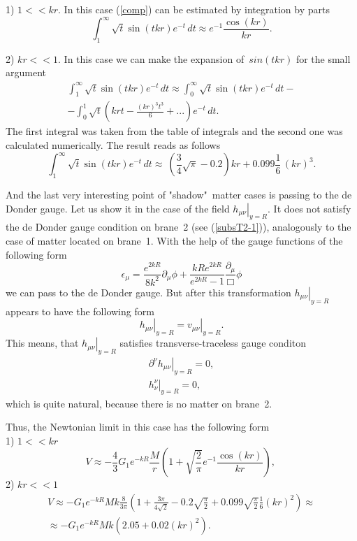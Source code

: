 \documentclass[a4paper,12pt]{article}
\begin{document}
1) $1<<kr$. In this case (\ref{comp}) can be estimated by
integration by parts
\begin{equation}
\int_1^\infty \sqrt{t}\sin(tkr)e^{-t}\,dt\approx
e^{-1}\frac{\cos(kr)}{kr}.
\end{equation}

2) $kr<<1$. In this case we can make the expansion of\, $sin(tkr)$ for
the small argument
\begin{eqnarray}
\int_1^\infty \sqrt{t}\sin(tkr)e^{-t}\,dt\approx \int_0^\infty
\sqrt{t}\sin(tkr)e^{-t}\,dt- \\ \nonumber
-\int_0^1 \sqrt{t}\left(krt-\frac{(kr)^3t^3}{6}+...\right)e^{-t}\,dt.
\end{eqnarray}
The first integral was taken from the table of integrals
\cite{Integ} and the second one was calculated numerically. The
result reads as follows
\begin{equation}
\int_1^\infty \sqrt{t}\sin(tkr)e^{-t}\,dt\approx \
\left(\frac{3}{4}\sqrt{\pi}-0.2\right)kr+0.099\frac{1}{6}\,(kr)^3.
\end{equation}

And the last very interesting point of "shadow"\ matter cases is
passing to the de Donder gauge. Let us show it in the case of the
field $\left. h_{\mu\nu}\right|_{y=R}$. It does not satisfy the de
Donder gauge condition on brane~2 (see (\ref{subsT2-1})),
analogously to the case of matter located on brane~1. With the
help of the gauge functions of the following form
\begin{equation}
\epsilon_\mu=\frac{e^{2kR}}{8k^2}\partial_{\mu}\phi+
\frac{kRe^{2kR}}{e^{2kR}-1}\frac{\partial_{\mu}}{\Box}\phi
\end{equation}
we can pass to the de Donder gauge. But after this transformation
$\left. h_{\mu\nu}\right|_{y=R}$ appears to have the following
form
\begin{equation}
\left. h_{\mu\nu}\right|_{y=R}=\left. v_{\mu\nu}\right|_{y=R}.
\end{equation}
This means, that $\left. h_{\mu\nu}\right|_{y=R}$ satisfies
transverse-traceless gauge conditon
\begin{eqnarray}
\left. \partial^\nu h_{\mu\nu}\right|_{y=R}=0, \\ \nonumber \left.
h_{\nu}^{\nu}\right|_{y=R}=0,
\end{eqnarray}
which is quite natural, because there is no matter on brane~2.

Thus, the Newtonian limit in this case has the following form \\ 1)
$1<<kr$
\begin{equation}\label{NL2}
V\approx
-\frac{4}{3}G_{1}e^{-kR}\frac{M}{r}\left(1+\sqrt{\frac{2}{\pi}}e^{-1}
\frac{\cos(kr)}{kr}\right),\,
\end{equation}
2) $kr<<1$
\begin{eqnarray}
V\approx
-G_{1}e^{-kR}Mk\frac{8}{3\pi}\left(1+\frac{3\pi}{4\sqrt{2}}-0.2\sqrt{\frac{\pi}{2}}+
0.099\sqrt{\frac{\pi}{2}}\frac{1}{6}(kr)^2\right)\approx \\
\nonumber \approx -G_{1}e^{-kR}Mk\left(2.05+0.02(kr)^2\right).\,
\end{eqnarray}
\end{document}
